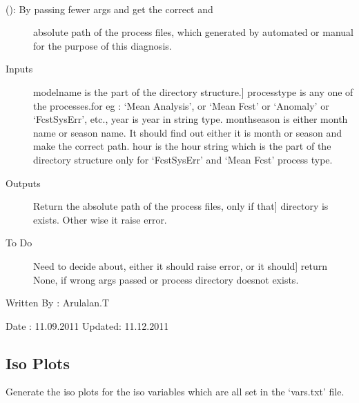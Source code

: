 \documentclass[letterpaper,10pt,english]{sphinxmanual}
\begin{document}

\begin{fulllineitems}
\label{diagnosis:generate_winds_plots.getProcessPath}~\begin{description}
\item[{{\hyperref[diagnosis:generate_winds_plots.getProcessPath]{}} (): By passing fewer args and get the correct and}] \leavevmode
absolute path of the process files, which generated by automated or
manual for the purpose of this diagnosis.

\item[{Inputs}] \leavevmode{[}modelname is the part of the directory structure.{]}
processtype is any one of the processes.for eg : `Mean Analysis',
or `Mean Fcst' or `Anomaly' or `FcstSysErr', etc.,
year is year in string type.
monthseason is either month name or season name. It should find
out either it is month or season and make the correct path.
hour is the hour string which is the part of the directory
structure only for `FcstSysErr' and `Mean Fcst' process type.

\item[{Outputs}] \leavevmode{[}Return the absolute path of the process files, only if that{]}
directory is exists. Other wise it raise error.

\item[{To Do}] \leavevmode{[}Need to decide about, either it should raise error, or it should{]}
return None, if wrong args passed or process directory doesnot
exists.

\end{description}

Written By : Arulalan.T

Date : 11.09.2011
Updated: 11.12.2011

\end{fulllineitems}



\subsection{Iso Plots}
\label{diagnosis:iso-plots}
Generate the iso plots for the iso variables which are all set in the `vars.txt' file.
\end{document}
